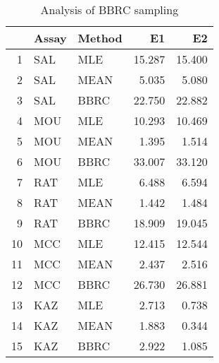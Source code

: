 \begin{table}[t]
\begin{center}
\begin{tabular}{rllrr}
  \hline
 & Assay & Method & E1 & E2 \\ 
  \hline
1 & SAL & MLE & 15.287 & 15.400 \\ 
  2 & SAL & MEAN & 5.035 & 5.080 \\ 
  3 & SAL & BBRC & 22.750 & 22.882 \\ 
  4 & MOU & MLE & 10.293 & 10.469 \\ 
  5 & MOU & MEAN & 1.395 & 1.514 \\ 
  6 & MOU & BBRC & 33.007 & 33.120 \\ 
  7 & RAT & MLE & 6.488 & 6.594 \\ 
  8 & RAT & MEAN & 1.442 & 1.484 \\ 
  9 & RAT & BBRC & 18.909 & 19.045 \\ 
  10 & MCC & MLE & 12.415 & 12.544 \\ 
  11 & MCC & MEAN & 2.437 & 2.516 \\ 
  12 & MCC & BBRC & 26.730 & 26.881 \\ 
  13 & KAZ & MLE & 2.713 & 0.738 \\ 
  14 & KAZ & MEAN & 1.883 & 0.344 \\ 
  15 & KAZ & BBRC & 2.922 & 1.085 \\ 
   \hline
\end{tabular}
\caption{Analysis of BBRC sampling}
\label{t:anal}
\end{center}
\end{table}
